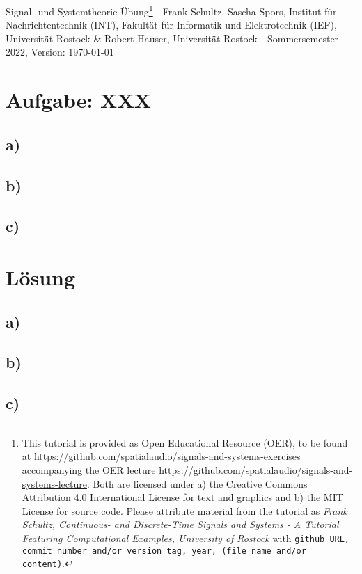 \documentclass[11pt,a4paper,DIV=12]{scrartcl}
\begin{document}
%
\noindent Signal- und Systemtheorie Übung\footnote{This tutorial is provided as
Open Educational Resource (OER), to be found at
\url{https://github.com/spatialaudio/signals-and-systems-exercises}
accompanying the OER lecture
\url{https://github.com/spatialaudio/signals-and-systems-lecture}.
%
Both are licensed under a) the Creative Commons Attribution 4.0 International
License for text and graphics and b) the MIT License for source code.
%
Please attribute material from the tutorial as \textit{Frank Schultz,
Continuous- and Discrete-Time Signals and Systems - A Tutorial Featuring
Computational Examples, University of Rostock} with
\texttt{github URL, commit number and/or version tag, year, (file name and/or
content)}.}---Frank Schultz, Sascha Spors,
Institut für Nachrichtentechnik (INT),
Fakultät für Informatik und Elektrotechnik (IEF),
Universität Rostock \&
Robert Hauser, Universität Rostock---Sommersemester 2022, Version: \today
%

\section*{Aufgabe: XXX}
\vspace{-0.4cm}{\tiny XXXXXXXXXX} %
%
%
%
\subsection*{a)}
\subsection*{b)}
\subsection*{c)}
%
%
%
\section*{Lösung}
%
%
%
\subsection*{a)}
\subsection*{b)}
\subsection*{c)}
%
%
%



\renewcommand{\refname}{Buchzitate}
\cite{Strang2007,Strang2010}
\clearpage

\end{document}
